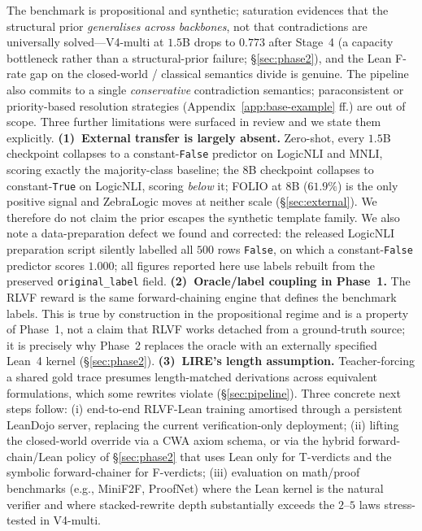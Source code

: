 \documentclass{article}
\begin{document}
The benchmark is propositional and synthetic; saturation evidences that the structural prior \emph{generalises across backbones}, not that contradictions are universally solved---V4-multi at $1.5$B drops to $0.773$ after Stage~4 (a capacity bottleneck rather than a structural-prior failure; \S\ref{sec:phase2}), and the Lean F-rate gap on the closed-world / classical semantics divide is genuine. The pipeline also commits to a single \emph{conservative} contradiction semantics; paraconsistent or priority-based resolution strategies (Appendix~\ref{app:base-example} ff.) are out of scope. Three further limitations were surfaced in review and we state them explicitly. \textbf{(1)~External transfer is largely absent.} Zero-shot, every $1.5$B checkpoint collapses to a constant-\texttt{False} predictor on LogicNLI and MNLI, scoring exactly the majority-class baseline; the $8$B checkpoint collapses to constant-\texttt{True} on LogicNLI, scoring \emph{below} it; FOLIO at $8$B ($61.9\%$) is the only positive signal and ZebraLogic moves at neither scale (\S\ref{sec:external}). We therefore do not claim the prior escapes the synthetic template family. We also note a data-preparation defect we found and corrected: the released LogicNLI preparation script silently labelled all $500$ rows \texttt{False}, on which a constant-\texttt{False} predictor scores $1.000$; all figures reported here use labels rebuilt from the preserved \texttt{original\_label} field. \textbf{(2)~Oracle/label coupling in Phase~1.} The \textsc{RLVF} reward is the same forward-chaining engine that defines the benchmark labels. This is true by construction in the propositional regime and is a property of Phase~1, not a claim that \textsc{RLVF} works detached from a ground-truth source; it is precisely why Phase~2 replaces the oracle with an externally specified Lean~4 kernel (\S\ref{sec:phase2}). \textbf{(3)~LIRE's length assumption.} Teacher-forcing a shared gold trace presumes length-matched derivations across equivalent formulations, which some rewrites violate (\S\ref{sec:pipeline}). Three concrete next steps follow: (i) end-to-end RLVF-Lean training amortised through a persistent LeanDojo server, replacing the current verification-only deployment; (ii) lifting the closed-world override via a CWA axiom schema, or via the hybrid forward-chain/Lean policy of \S\ref{sec:phase2} that uses Lean only for T-verdicts and the symbolic forward-chainer for F-verdicts; (iii) evaluation on math/proof benchmarks (e.g., MiniF2F, ProofNet) where the Lean kernel is the natural verifier and where stacked-rewrite depth substantially exceeds the $2$--$5$ laws stress-tested in V4-multi.
\end{document}
